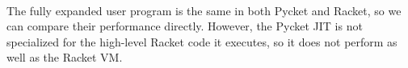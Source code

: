 		\paragraph{}%
		The fully expanded user program is the same in both Pycket and Racket, so we can compare their performance directly.  However, the Pycket JIT is not specialized for the high-level Racket code it executes, so it does not perform as well as the Racket VM.






